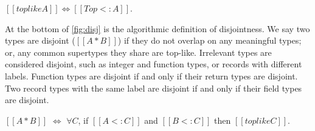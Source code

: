 \begin{theorem}
  $[[toplike A]] \iff [[Top<:A]]$.
\end{theorem}

At the bottom of \autoref{fig:disj} is the algorithmic definition of
disjointness. We say two types are disjoint ($[[A*B]]$) if they do not overlap
on any meaningful types; or, any common supertypes they share are top-like.
Irrelevant types are considered disjoint, such as integer and function types, or
records with different labels. Function types are disjoint if and only if their
return types are disjoint. Two record types with the same label are disjoint if
and only if their field types are disjoint.

\begin{theorem}\label{thm:disjoint}
  $[[A*B]]$ $\iff$
  $\forall C$, if $[[A<:C]]$ and $[[B<:C]]$ then $[[toplike C]]$.
\end{theorem}

